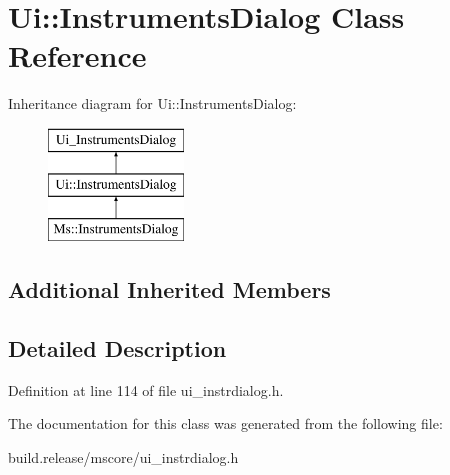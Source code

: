 \hypertarget{class_ui_1_1_instruments_dialog}{}\section{Ui\+:\+:Instruments\+Dialog Class Reference}
\label{class_ui_1_1_instruments_dialog}
Inheritance diagram for Ui\+:\+:Instruments\+Dialog\+:\begin{figure}[H]
\begin{center}
\leavevmode
\includegraphics[height=3.000000cm]{class_ui_1_1_instruments_dialog}
\end{center}
\end{figure}
\subsection*{Additional Inherited Members}


\subsection{Detailed Description}


Definition at line 114 of file ui\+\_\+instrdialog.\+h.



The documentation for this class was generated from the following file\+:\begin{DoxyCompactItemize}
\item 
build.\+release/mscore/ui\+\_\+instrdialog.\+h\end{DoxyCompactItemize}
